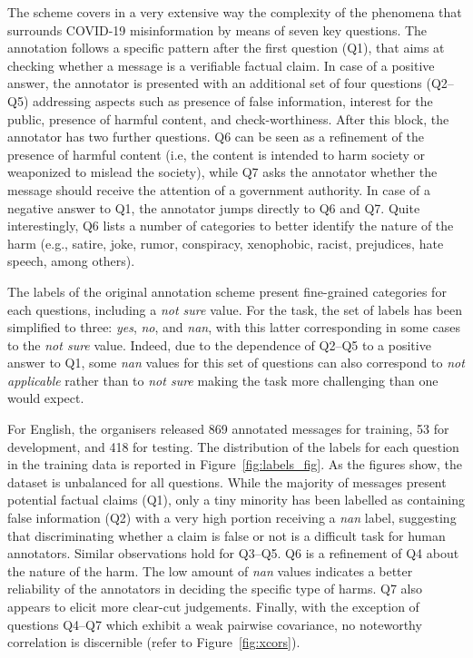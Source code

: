 \documentclass[11pt,a4paper]{article}
\begin{document}
The scheme covers in a very extensive way the complexity of the phenomena that surrounds COVID-19 misinformation by means of seven key questions. The annotation follows a specific pattern after the first question (Q1), that aims at checking whether a message is a verifiable factual claim. In case of a positive answer, the annotator is presented with an additional  set of four questions (Q2--Q5) addressing aspects such as presence of false information, interest for the public, presence of harmful content, and check-worthiness. After this block, the annotator has two further questions. Q6 can be seen as a refinement of the presence of harmful content (i.e, the content is intended to harm society or weaponized to mislead the society), while Q7 asks the annotator whether the message should receive the attention of a government authority. In case of a negative answer to Q1, the annotator jumps directly to Q6 and Q7. Quite interestingly, Q6 lists a number of categories to better identify the nature of the harm (e.g., satire, joke, rumor, conspiracy, xenophobic, racist, prejudices, hate speech, among others). 

The labels of the original annotation scheme present fine-grained categories for each questions, including a \textit{not sure} value. For the task, the set of labels has been simplified to three: \textit{yes}, \textit{no}, and \textit{nan}, with this latter corresponding in some cases to the \textit{not sure} value. Indeed, due to the dependence of Q2--Q5 to a positive answer to Q1, some \textit{nan} values for this set of questions can also correspond to \textit{not applicable} rather than to \textit{not sure}  making the task more challenging than one would expect.

For English, the organisers released 869 annotated messages for training, 53 for development, and 418 for testing. The distribution of the labels for each question in the training data is reported in Figure~\ref{fig:labels_fig}. As the figures show, the dataset is unbalanced for all questions. While the majority of messages present potential factual claims (Q1), only a tiny minority has been labelled as containing false information (Q2) with a very high portion receiving a \textit{nan} label, suggesting that discriminating whether a claim is false or not is a difficult task for human annotators. Similar observations hold for Q3--Q5. Q6 is a refinement of Q4 about the nature of the harm. The low amount of \textit{nan} values indicates a better reliability of the annotators in deciding the specific type of harms. Q7 also appears to elicit more clear-cut judgements.   
Finally, with the exception of questions Q4--Q7 which exhibit a weak pairwise covariance, no noteworthy correlation is discernible (refer to Figure~\ref{fig:xcors}).
\end{document}
